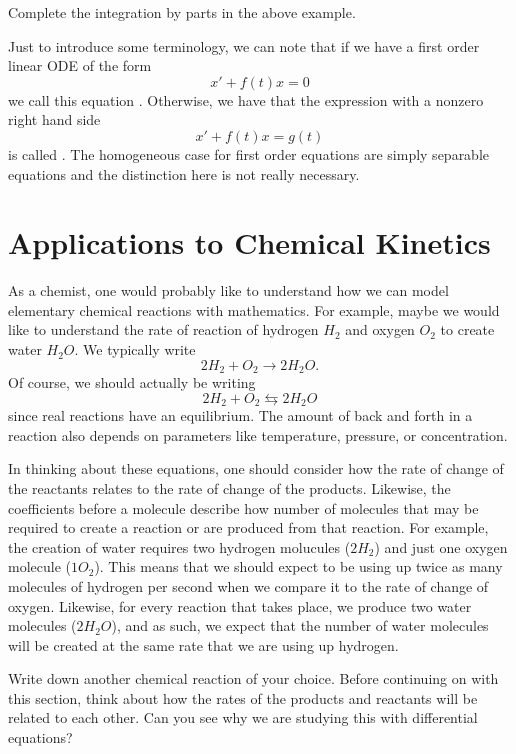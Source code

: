         \begin{exercise}
            Complete the integration by parts in the above example.
        \end{exercise}

        Just to introduce some terminology, we can note that if we have a first order linear ODE of the form
        \[
        x'+f(t)x=0
        \]
        we call this equation .  Otherwise, we have that the expression with a nonzero right hand side
        \[
        x'+ f(t)x=g(t)
        \]
        is called .  The homogeneous case for first order equations are simply separable equations and the distinction here is not really necessary.

        \section{Applications to Chemical Kinetics}
        As a chemist, one would probably like to understand how we can model elementary chemical reactions with mathematics.  For example, maybe we would like to understand the rate of reaction of hydrogen $H_2$ and oxygen $O_2$ to create water $H_2 O$. We typically write
        \[
        2H_2 + O_2 \to 2H_2O.
        \]
        \noindent Of course, we should actually be writing
        \[
        2H_2 + O_2 \leftrightarrows 2H_2O
        \]
        since real reactions have an equilibrium.  The amount of back and forth in a reaction also depends on parameters like temperature, pressure, or concentration.

        In thinking about these equations, one should consider how the rate of change of the reactants relates to the rate of change of the products.  Likewise, the coefficients before a molecule describe how number of molecules that may be required to create a reaction or are produced from that reaction.  For example, the creation of water requires two hydrogen molucules ($2H_2$) and just one oxygen molecule ($1O_2$).  This means that we should expect to be using up twice as many molecules of hydrogen per second when we compare it to the rate of change of oxygen.  Likewise, for every reaction that takes place, we produce two water molecules ($2H_2O$), and as such, we expect that the number of water molecules will be created at the same rate that we are using up hydrogen.

        \begin{question}
            Write down another chemical reaction of your choice.  Before continuing on with this section, think about how the rates of the products and reactants will be related to each other. Can you see why we are studying this with differential equations?
        \end{question}

